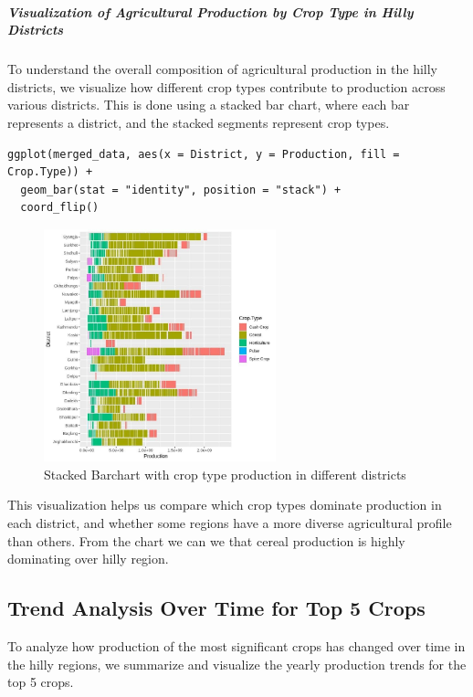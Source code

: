 \subparagraph*{Visualization of Agricultural Production by Crop Type in Hilly Districts
}
To understand the overall composition of agricultural production in the hilly districts, we visualize how different crop types contribute to production across various districts. This is done using a stacked bar chart, where each bar represents a district, and the stacked segments represent crop types.

\begin{verbatim}
ggplot(merged_data, aes(x = District, y = Production, fill = Crop.Type)) +
  geom_bar(stat = "identity", position = "stack") +
  coord_flip()
\end{verbatim}

\begin{figure}[h]
\centering
\includegraphics[width=0.6\textwidth]{figures/stacked_agri.jpg}
\caption{Stacked Barchart with crop type production in different districts}
\end{figure}

This visualization helps us compare which crop types dominate production in each district, and whether some regions have a more diverse agricultural profile than others. From the chart we can we that cereal production is highly dominating over hilly region.

\subsection*{Trend Analysis Over Time for Top 5 Crops}

To analyze how production of the most significant crops has changed over time in the hilly regions, we summarize and visualize the yearly production trends for the top 5 crops.


